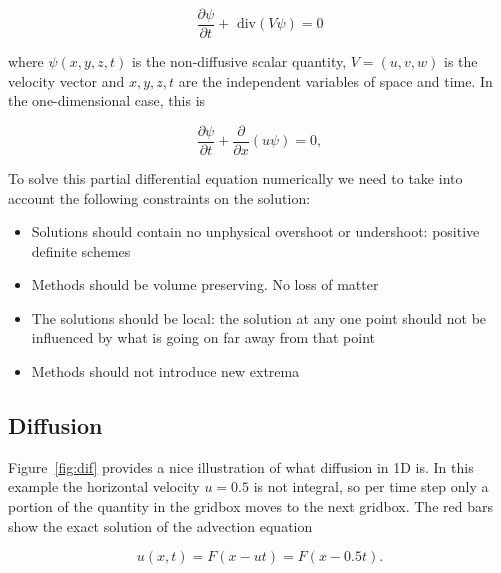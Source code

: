 \documentclass[10pt, a4paper]{article}
\begin{document}
\begin{equation}
\frac{\partial \psi}{\partial t} + \text{ div}(V\psi) = 0
\end{equation}

where $\psi(x,y,z,t)$ is the non-diffusive scalar quantity, $V=(u,v,w)$ is the velocity vector and $x,y,z,t$ are the independent variables of space and time. In the one-dimensional case, this is 

\begin{equation}
\frac{\partial \psi}{\partial t} + \frac{\partial}{\partial x}(u\psi) = 0,
\end{equation}

To solve this partial differential equation numerically we need to take into account the following constraints on the solution:

\begin{itemize}
\item Solutions should contain no unphysical overshoot or undershoot: positive definite schemes
\item Methods should be volume preserving. No loss of matter
\item The solutions should be local: the solution at any one point should not be influenced by what is going on far away from that point
\item Methods should not introduce new extrema
\end{itemize}

\subsection{Diffusion}
Figure~\ref{fig:dif} provides a nice illustration of what diffusion in 1D is. In this example the horizontal velocity $u=0.5$ is not integral, so per time step only a portion of the quantity in the gridbox moves to the next gridbox. The red bars show the exact solution of the advection equation

\begin{equation}
 u(x,t)=F(x-ut)=F(x-0.5t).
\end{equation}
\end{document}
